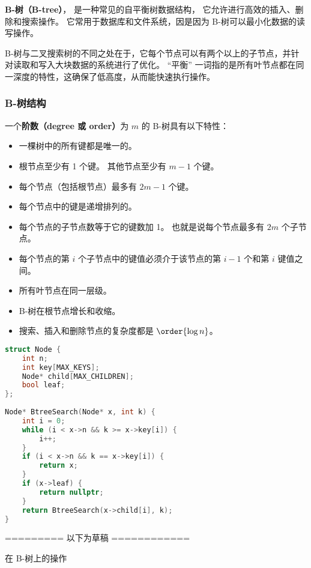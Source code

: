 
\begin{issues}
\issueDraft
\end{issues}


\textbf{B-树（B-tree）}， 是一种常见的自平衡树数据结构， 它允许进行高效的插入、删除和搜索操作。 它常用于数据库和文件系统，因是因为 B-树可以最小化数据的读写操作。

B-树与二叉搜索树的不同之处在于，它每个节点可以有两个以上的子节点，并针对读取和写入大块数据的系统进行了优化。 “平衡” 一词指的是所有叶节点都在同一深度的特性，这确保了低高度，从而能快速执行操作。

\subsubsection{B-树结构}
一个\textbf{阶数（degree 或 order）}为 $m$ 的 B-树具有以下特性：
\begin{itemize}
\item 一棵树中的所有键都是唯一的。
\item 根节点至少有 1 个键。 其他节点至少有 $m-1$ 个键。
\item 每个节点（包括根节点）最多有 $2m-1$ 个键。
\item 每个节点中的键是递增排列的。
\item 每个节点的子节点数等于它的键数加 1。 也就是说每个节点最多有 $2m$ 个子节点。
\item 每个节点的第 $i$ 个子节点中的键值必须介于该节点的第 $i-1$ 个和第 $i$ 键值之间。
\item 所有叶节点在同一层级。
\item B-树在根节点增长和收缩。
\item 搜索、插入和删除节点的复杂度都是 $\order{\log n}$。
\end{itemize}

\begin{lstlisting}[language=cpp]
struct Node {
    int n;
    int key[MAX_KEYS];
    Node* child[MAX_CHILDREN];
    bool leaf;
};
 
Node* BtreeSearch(Node* x, int k) {
    int i = 0;
    while (i < x->n && k >= x->key[i]) {
        i++;
    }
    if (i < x->n && k == x->key[i]) {
        return x;
    }
    if (x->leaf) {
        return nullptr;
    }
    return BtreeSearch(x->child[i], k);
}
\end{lstlisting}


========= 以下为草稿 ============


在 B-树上的操作

